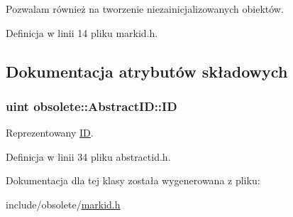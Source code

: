Pozwalam również na tworzenie niezainicjalizowanych obiektów. 



Definicja w linii 14 pliku markid.h.



\subsection{Dokumentacja atrybutów składowych}
\hypertarget{classobsolete_1_1AbstractID_a5f67fa1c7d96085f0ef41193b60b570c}{
\subsubsection[{ID}]{\setlength{\rightskip}{0pt plus 5cm}uint {\bf obsolete::AbstractID::ID}}}
\label{classobsolete_1_1AbstractID_a5f67fa1c7d96085f0ef41193b60b570c}


Reprezentowany \hyperlink{classobsolete_1_1ID}{ID}. 



Definicja w linii 34 pliku abstractid.h.



Dokumentacja dla tej klasy została wygenerowana z pliku:\begin{DoxyCompactItemize}
\item 
include/obsolete/\hyperlink{markid_8h}{markid.h}\end{DoxyCompactItemize}
